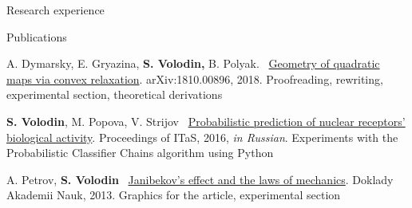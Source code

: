\documentclass{resume} %
\begin{document}
\begin{rSection}{Research experience}
\end{rSection}

\begin{rSection}{Publications}
\vspace{-1em}
\item A. Dymarsky, E. Gryazina, {\bf S. Volodin,} B. Polyak. \faExternalLink~\href{https://arxiv.org/pdf/1810.00896.pdf}{Geometry of quadratic maps via convex relaxation}. arXiv:1810.00896, 2018. Proofreading, rewriting, experimental section, theoretical derivations
\item {\bf S. Volodin}, M. Popova, V. Strijov \faExternalLink~\href{http://itas2016.iitp.ru/pdf/1570303389.pdf}{Probabilistic prediction of nuclear receptors’ biological activity}. Proceedings of ITaS, 2016, {\em in Russian}. Experiments with the Probabilistic Classifier Chains algorithm using Python
\item A. Petrov, {\bf S. Volodin} \faExternalLink~\href{https://link.springer.com/article/10.1134/S1028335813080041}{Janibekov's effect and the laws of mechanics}. Doklady Akademii Nauk, 2013. Graphics for the article, experimental section
\end{rSection}
\end{document}
